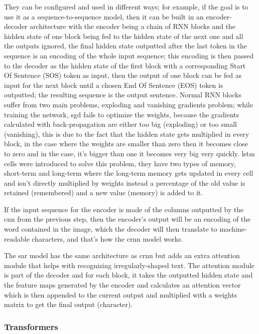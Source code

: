They can be configured and used in different ways; for example, if the goal is to use it as a sequence-to-sequence model, then it can be built in an encoder-decoder architecture with the encoder being a chain of RNN blocks and the hidden state of one block being fed to the hidden state of the next one and all the outputs ignored, the final hidden state outputted after the last token in the sequence is an encoding of the whole input sequence; this encoding is then passed to the decoder as the hidden state of the first block with a corresponding Start Of Sentence (SOS) token as input, then the output of one block can be fed as input for the next block until a chosen End Of Sentence (EOS) token is outputted; the resulting sequence is the output sentence.
Normal RNN blocks suffer from two main problems, exploding and vanishing gradients problem; while training the network, \gls{sgd} fails to optimize the weights, because the gradients calculated with back-propagation are either too big (exploding) or too small (vanishing), this is due to the fact that the hidden state gets multiplied in every block, in the case where the weights are smaller than zero then it becomes close to zero and in the case, it's bigger than one it becomes very big very quickly. \gls{lstm} cells were introduced to solve this problem, they have two types of memory, short-term and long-term where the long-term memory gets updated in every cell and isn't directly multiplied by weights instead a percentage of the old value is retained (remembered) and a new value (memory) is added to it.

If the input sequence for the encoder is made of the columns outputted by the \gls{cnn} from the previous step, then the encoder's output will be an encoding of the word contained in the image, which the decoder will then translate to machine-readable characters, and that's how the \gls{crnn} model \cite{shi_end--end_2017} works.

\label{sar}The \gls{sar} model \cite{li_show_2019} has the same architecture as \gls{crnn} but adds an extra attention module that helps with recognizing irregularly-shaped text. The attention module is part of the decoder and for each block, it takes the outputted hidden state and the feature maps generated by the encoder and calculates an attention vector which is then appended to the current output and multiplied with a weights matrix to get the final output (character).

\subsubsection*{Transformers}

